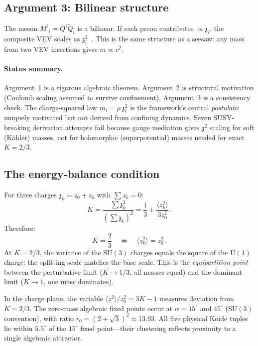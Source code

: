 \documentclass[12pt,a4paper]{article}
\newcommand{\SU}{\mathrm{SU}}
\newcommand{\UU}{\mathrm{U}}
\newcommand{\zch}{\mathfrak{z}}
\begin{document}
\subsection{Argument 3: Bilinear structure}

The meson $M^i{}_i = Q^i\tilde{Q}_i$ is a bilinear.
If each preon contributes $\propto \zch_i$, the composite VEV
scales as $\zch_i^2$~\cite{Koide:1990}.
This is the same structure as a seesaw: any mass from two VEV
insertions gives $m \propto v^2$.

\paragraph{Status summary.}
Argument~1 is a rigorous algebraic theorem.
Argument~2 is structural motivation (Coulomb scaling
assumed to survive confinement).
Argument~3 is a consistency check.
The charge-squared law $m_i = \mu\,\zch_i^2$ is the framework's
central \emph{postulate}: uniquely motivated but not derived from
confining dynamics.
Seven SUSY-breaking derivation attempts fail because gauge
mediation gives $\zch^2$ scaling for soft (K\"ahler) masses,
not for holomorphic (superpotential) masses needed for exact
$K = 2/3$.


\subsection{The energy-balance condition}

For three charges $\zch_k = z_0 + z_k$ with $\sum z_k = 0$:
\begin{equation}
  K = \frac{\sum \zch_k^2}{(\sum \zch_k)^2}
  = \frac{1}{3} + \frac{\langle z_k^2\rangle}{3z_0^2}\,.
  \label{eq:K_derivation}
\end{equation}
Therefore:
\begin{equation}
  \boxed{K = \frac{2}{3}
  \quad\Longleftrightarrow\quad
  \langle z_k^2\rangle = z_0^2\,.}
  \label{eq:energy_balance}
\end{equation}
At $K = 2/3$, the variance of the $\SU(3)$ charges equals the
square of the $\UU(1)$ charge: the splitting scale matches the
base scale.
This is the \emph{equipartition point} between the perturbative
limit ($K \to 1/3$, all masses equal) and the dominant limit
($K \to 1$, one mass dominates).

In the charge plane, the variable
$\langle z^2\rangle/z_0^2 = 3K - 1$ measures deviation from
$K = 2/3$.
The zero-mass algebraic fixed points occur at
$\alpha = 15^\circ$ and $45^\circ$ ($\SU(3)$ convention), with
ratio $r_0 = (2+\sqrt{3})^2 \approx 13.93$.
All five physical Koide tuples lie within $5.5^\circ$ of the
$15^\circ$ fixed point---their clustering reflects proximity to
a single algebraic attractor.
\end{document}

